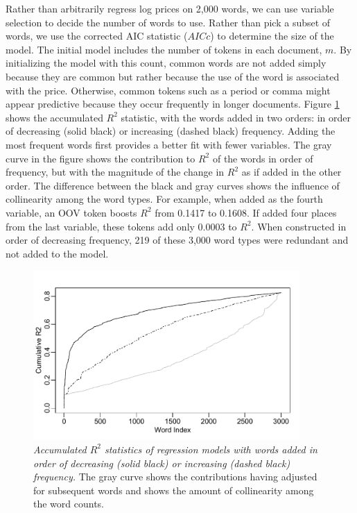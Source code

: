 \documentclass[12pt]{article}
\begin{document}
Rather than arbitrarily regress log prices on 2,000 words, we can use variable selection to decide the number of words to use.  Rather than pick a subset of words, we use the corrected AIC statistic ($AICc$) to determine the size of the model.  The initial model includes the number of tokens in each document, $m$.  By initializing the model with this count, common words are not added simply because they are common but rather because the use of the word is associated with the price.  Otherwise, common tokens such as a period or comma might appear predictive  because they occur frequently in longer documents.  Figure \ref{fig:cumr2} shows the accumulated $R^2$ statistic, with the words added in two orders: in order of decreasing (solid black) or increasing (dashed black) frequency.  Adding the most frequent words first provides a better fit with fewer variables.  The gray curve in the figure shows the contribution to $R^2$ of the words in order of frequency, but with the magnitude of the change in $R^2$ as if added in the other order.  The difference between the black and gray curves shows the influence of collinearity among the word types.  For example, when added as the fourth variable, an OOV token boosts $R^2$ from 0.1417 to 0.1608.  If added four places from the last variable, these tokens add only 0.0003 to  $R^2$.  When constructed in order of decreasing frequency, 219 of these 3,000 word types were redundant and not added to the model.


\begin{figure}
\caption{  \label{fig:cumr2}  
  {\sl Accumulated $R^2$ statistics of regression models with words added in order of decreasing (solid black) or increasing (dashed black) frequency.} The gray curve shows the contributions having adjusted for subsequent words and shows the amount of collinearity among the word counts.}  
  \centerline{ \includegraphics[width=4in]{figures/cum_r2.pdf} }
\end{figure}
\end{document}
